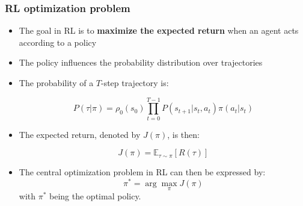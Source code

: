 \documentclass[9pt]{beamer}
\newcommand{\E}{{\mathbb E}}
\begin{document}



\begin{frame}

	\frametitle{RL optimization problem}

		\begin{itemize}
			\item The goal in RL is to \textbf{maximize the expected return} when an agent acts according to a policy
			\item The policy influences the probability distribution over trajectories
		\item The probability of a $T$-step trajectory is:

			\begin{equation}
				P(\tau|\pi) = \rho_0 (s_0) \prod_{t=0}^{T-1} P(s_{t+1} | s_t, a_t) \pi(a_t | s_t)
			\end{equation}
		
		
		\item The expected return, denoted by $J(\pi)$, is then:

			\begin{equation}
			J(\pi) = \E_{\tau\sim \pi}{[R(\tau)]}
			\label{eq:loss}
			\end{equation}

		\item The central optimization problem in RL can then be expressed by:
			\begin{equation}
			\pi^* = \arg \max_{\pi} J(\pi)
			\label{eq:max_loss}
			\end{equation}
				with $\pi^*$ being the optimal policy.
		\end{itemize}
		
\end{frame}

\end{document}
